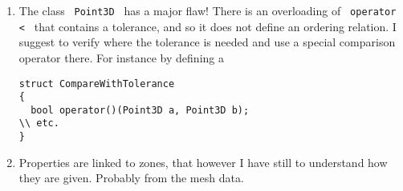 \documentclass{article}
\newcommand{\li}{\lstinline}
\newcommand{\cpp}[1]{\li! #1 !}
\begin{document}
\begin{enumerate}
\item The class \cpp{Point3D} has a major flaw! There is an overloading of \cpp{operator <} that contains a tolerance, and so it does not define
an ordering relation. I suggest to verify where the tolerance is needed and use a special comparison operator there. For instance by defining a
\begin{lstlisting}
struct CompareWithTolerance
{
  bool operator()(Point3D a, Point3D b);
\\ etc.
}
\end{lstlisting}
\item Properties are linked to zones, that however I have still to understand how they are given. Probably from the mesh data.
\end{enumerate}
\end{document}
